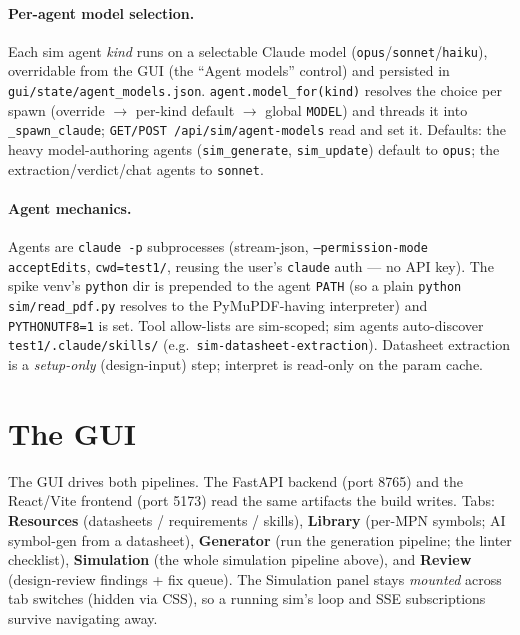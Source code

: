 \documentclass[11pt]{article}
\newcommand{\file}[1]{\texttt{#1}}
\newcommand{\mod}[1]{\texttt{#1}}
\begin{document}
\paragraph{Per-agent model selection.} Each sim agent \emph{kind} runs on a
selectable Claude model (\texttt{opus}/\texttt{sonnet}/\texttt{haiku}),
overridable from the GUI (the ``Agent models'' control) and persisted in
\file{gui/state/agent\_models.json}. \mod{agent.model\_for(kind)} resolves the
choice per spawn (override $\to$ per-kind default $\to$ global \texttt{MODEL}) and
threads it into \texttt{\_spawn\_claude}; \texttt{GET/POST /api/sim/agent-models}
read and set it. Defaults: the heavy model-authoring agents
(\texttt{sim\_generate}, \texttt{sim\_update}) default to \texttt{opus}; the
extraction/verdict/chat agents to \texttt{sonnet}.

\paragraph{Agent mechanics.} Agents are \texttt{claude -p} subprocesses
(stream-json, \texttt{--permission-mode acceptEdits}, \texttt{cwd=test1/},
reusing the user's \texttt{claude} auth --- no API key). The spike venv's
\texttt{python} dir is prepended to the agent \texttt{PATH} (so a plain
\texttt{python sim/read\_pdf.py} resolves to the PyMuPDF-having interpreter) and
\texttt{PYTHONUTF8=1} is set. Tool allow-lists are sim-scoped; sim agents
auto-discover \file{test1/.claude/skills/} (e.g.\ \texttt{sim-datasheet-extraction}).
Datasheet extraction is a \emph{setup-only} (design-input) step; interpret is
read-only on the param cache.

\section{The GUI}\label{sec:gui}

The GUI drives both pipelines. The FastAPI backend (port 8765) and the
React/Vite frontend (port 5173) read the same artifacts the build writes. Tabs:
\textbf{Resources} (datasheets / requirements / skills), \textbf{Library}
(per-MPN symbols; AI symbol-gen from a datasheet), \textbf{Generator} (run the
generation pipeline; the linter checklist), \textbf{Simulation} (the whole
simulation pipeline above), and \textbf{Review} (design-review findings + fix
queue). The Simulation panel stays \emph{mounted} across tab switches (hidden via
CSS), so a running sim's loop and SSE subscriptions survive navigating away.
\end{document}
